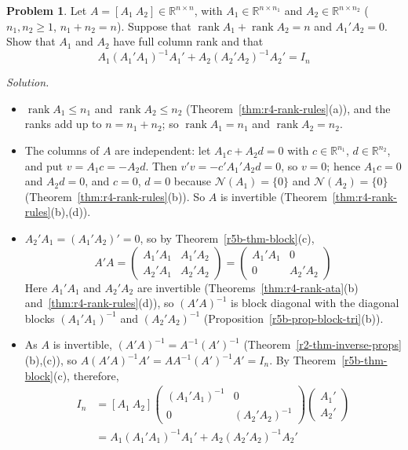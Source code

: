 \documentclass[12pt]{article}
\newcommand{\R}{\mathbb R}
\DeclareMathOperator{\rank}{rank}
\theoremstyle{definition}
\newtheorem{problem}{Problem}
\newenvironment{solution}{\par\noindent\textit{Solution.}\ }{\par\smallskip}
\begin{document}
\begin{problem}\label{r6-ex-complementary-projections}
Let \(A=[A_1\ A_2]\in\R^{n\times n}\), with \(A_1\in\R^{n\times n_1}\) and \(A_2\in\R^{n\times n_2}\)
(\(n_1,n_2\geqslant1\), \(n_1+n_2=n\)). Suppose that \(\rank A_1+\rank A_2=n\) and \(A_1'A_2=0\). Show that \(A_1\)
and \(A_2\) have full column rank and that
\[
A_1(A_1'A_1)^{-1}A_1'+A_2(A_2'A_2)^{-1}A_2'=I_n
\]
\end{problem}
\begin{solution}
\begin{itemize}
\item \(\rank A_1\leqslant n_1\) and \(\rank A_2\leqslant n_2\) (Theorem~\ref{thm:r4-rank-rules}(a)), and the
ranks add up to \(n=n_1+n_2\); so \(\rank A_1=n_1\) and \(\rank A_2=n_2\).
\item The columns of \(A\) are independent: let \(A_1c+A_2d=0\) with \(c\in\R^{n_1}\), \(d\in\R^{n_2}\), and put
\(v=A_1c=-A_2d\). Then \(v'v=-c'A_1'A_2d=0\), so \(v=0\); hence \(A_1c=0\) and \(A_2d=0\), and \(c=0\), \(d=0\)
because \(\mathcal N(A_1)=\{0\}\) and \(\mathcal N(A_2)=\{0\}\) (Theorem~\ref{thm:r4-rank-rules}(b)). So \(A\) is
invertible (Theorem~\ref{thm:r4-rank-rules}(b),(d)).
\item \(A_2'A_1=(A_1'A_2)'=0\), so by Theorem~\ref{r5b-thm-block}(c),
\[
A'A=\begin{pmatrix}A_1'A_1&A_1'A_2\\A_2'A_1&A_2'A_2\end{pmatrix}=\begin{pmatrix}A_1'A_1&0\\0&A_2'A_2\end{pmatrix}
\]
Here \(A_1'A_1\) and \(A_2'A_2\) are invertible (Theorems~\ref{thm:r4-rank-ata}(b) and~\ref{thm:r4-rank-rules}(d)),
so \((A'A)^{-1}\) is block diagonal with the diagonal blocks \((A_1'A_1)^{-1}\) and \((A_2'A_2)^{-1}\)
(Proposition~\ref{r5b-prop-block-tri}(b)).
\item As \(A\) is invertible, \((A'A)^{-1}=A^{-1}(A')^{-1}\) (Theorem~\ref{r2-thm-inverse-props}(b),(c)), so
\(A(A'A)^{-1}A'=AA^{-1}(A')^{-1}A'=I_n\). By Theorem~\ref{r5b-thm-block}(c), therefore,
\[
\begin{aligned}
I_n&=[A_1\ A_2]\begin{pmatrix}(A_1'A_1)^{-1}&0\\0&(A_2'A_2)^{-1}\end{pmatrix}\begin{pmatrix}A_1'\\A_2'\end{pmatrix}\\
&=A_1(A_1'A_1)^{-1}A_1'+A_2(A_2'A_2)^{-1}A_2'
\end{aligned}
\]
\end{itemize}
\end{solution}
\end{document}
